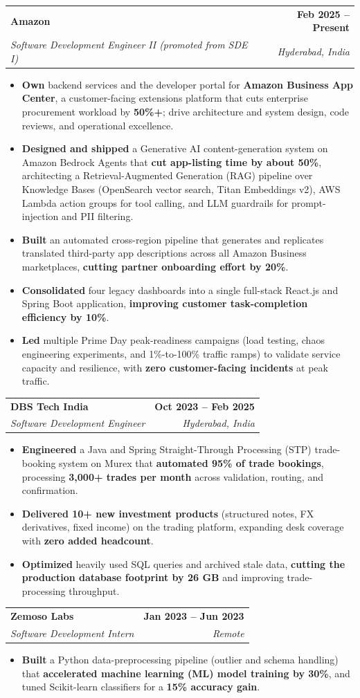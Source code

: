 \documentclass[letterpaper,10pt]{article}
\makeatletter
\newcommand{\resumeItem}[1]{
  \item\small{
    {#1 \vspace{-2pt}}
  }
}
\newcommand{\resumeSubheading}[4]{
  \vspace{-2pt}\item
    \begin{tabular*}{1.0\textwidth}[t]{l@{\extracolsep{\fill}}r}
      \textbf{#1} & \textbf{\small #2} \\
      \textit{\small#3} & \textit{\small #4} \\
    \end{tabular*}\vspace{-7pt}
}
\newcommand{\resumeItemListStart}{\begin{itemize}[leftmargin=0.18in, itemsep=-1pt, topsep=3pt]}
\newcommand{\resumeItemListEnd}{\end{itemize}\vspace{-5pt}}
\makeatother
\begin{document}
    \resumeSubheading
      {Amazon}{Feb 2025 -- Present}
      {Software Development Engineer II (promoted from SDE I)}{Hyderabad, India}
      \resumeItemListStart
        \resumeItem{\textbf{Own} backend services and the developer portal for \textbf{Amazon Business App Center}, a customer-facing extensions platform that cuts enterprise procurement workload by \textbf{50\%+}; drive architecture and system design, code reviews, and operational excellence.}
        \resumeItem{\textbf{Designed and shipped} a Generative AI content-generation system on Amazon Bedrock Agents that \textbf{cut app-listing time by about 50\%}, architecting a Retrieval-Augmented Generation (RAG) pipeline over Knowledge Bases (OpenSearch vector search, Titan Embeddings v2), AWS Lambda action groups for tool calling, and LLM guardrails for prompt-injection and PII filtering.}
        \resumeItem{\textbf{Built} an automated cross-region pipeline that generates and replicates translated third-party app descriptions across all Amazon Business marketplaces, \textbf{cutting partner onboarding effort by 20\%}.}
        \resumeItem{\textbf{Consolidated} four legacy dashboards into a single full-stack React.js and Spring Boot application, \textbf{improving customer task-completion efficiency by 10\%}.}
        \resumeItem{\textbf{Led} multiple Prime Day peak-readiness campaigns (load testing, chaos engineering experiments, and 1\%-to-100\% traffic ramps) to validate service capacity and resilience, with \textbf{zero customer-facing incidents} at peak traffic.}
      \resumeItemListEnd

    \resumeSubheading
      {DBS Tech India}{Oct 2023 -- Feb 2025}
      {Software Development Engineer}{Hyderabad, India}
      \resumeItemListStart
        \resumeItem{\textbf{Engineered} a Java and Spring Straight-Through Processing (STP) trade-booking system on Murex that \textbf{automated 95\% of trade bookings}, processing \textbf{3{,}000+ trades per month} across validation, routing, and confirmation.}
        \resumeItem{\textbf{Delivered 10+ new investment products} (structured notes, FX derivatives, fixed income) on the trading platform, expanding desk coverage with \textbf{zero added headcount}.}
        \resumeItem{\textbf{Optimized} heavily used SQL queries and archived stale data, \textbf{cutting the production database footprint by 26 GB} and improving trade-processing throughput.}
      \resumeItemListEnd

    \resumeSubheading
      {Zemoso Labs}{Jan 2023 -- Jun 2023}
      {Software Development Intern}{Remote}
      \resumeItemListStart
        \resumeItem{\textbf{Built} a Python data-preprocessing pipeline (outlier and schema handling) that \textbf{accelerated machine learning (ML) model training by 30\%}, and tuned Scikit-learn classifiers for a \textbf{15\% accuracy gain}.}
      \resumeItemListEnd
\end{document}
